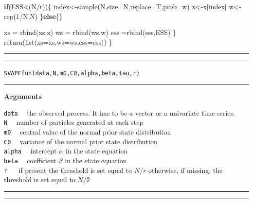 \documentclass[
]{book}
\newenvironment{Shaded}{\begin{snugshade}}{\end{snugshade}}
\newcommand{\AttributeTok}[1]{\textcolor[rgb]{0.77,0.63,0.00}{#1}}
\newcommand{\ControlFlowTok}[1]{\textcolor[rgb]{0.13,0.29,0.53}{\textbf{#1}}}
\newcommand{\DecValTok}[1]{\textcolor[rgb]{0.00,0.00,0.81}{#1}}
\newcommand{\FunctionTok}[1]{\textcolor[rgb]{0.00,0.00,0.00}{#1}}
\newcommand{\NormalTok}[1]{#1}
\newcommand{\OtherTok}[1]{\textcolor[rgb]{0.56,0.35,0.01}{#1}}
\newcommand{\SpecialCharTok}[1]{\textcolor[rgb]{0.00,0.00,0.00}{#1}}
\theoremstyle{break}
\theoremstyle{nonumberplain}
\begin{document}
\begin{Shaded}
\begin{Highlighting}[]
    \ControlFlowTok{if}\NormalTok{(ESS}\SpecialCharTok{\textless{}}\NormalTok{(N}\SpecialCharTok{/}\NormalTok{r))\{}
\NormalTok{      index}\OtherTok{\textless{}{-}}\FunctionTok{sample}\NormalTok{(N,}\AttributeTok{size=}\NormalTok{N,}\AttributeTok{replace=}\NormalTok{T,}\AttributeTok{prob=}\NormalTok{w)}
\NormalTok{      x}\OtherTok{\textless{}{-}}\NormalTok{x[index]}
\NormalTok{      w}\OtherTok{\textless{}{-}}\FunctionTok{rep}\NormalTok{(}\DecValTok{1}\SpecialCharTok{/}\NormalTok{N,N)}
\NormalTok{    \}}\ControlFlowTok{else}\NormalTok{\{\}}
    
\NormalTok{    xs }\OtherTok{=} \FunctionTok{rbind}\NormalTok{(xs,x)}
\NormalTok{    ws }\OtherTok{=} \FunctionTok{rbind}\NormalTok{(ws,w)}
\NormalTok{    ess }\OtherTok{=}\FunctionTok{rbind}\NormalTok{(ess,ESS)}
\NormalTok{  \}}
  \FunctionTok{return}\NormalTok{(}\FunctionTok{list}\NormalTok{(}\AttributeTok{xs=}\NormalTok{xs,}\AttributeTok{ws=}\NormalTok{ws,}\AttributeTok{ess=}\NormalTok{ess))}
\NormalTok{\}}
\end{Highlighting}
\end{Shaded}

\hfill\break

\hrule
\hrule

\hfill\break
\texttt{SVAPFfun(data,N,m0,C0,alpha,beta,tau,r)}\\

\hrule

\textbf{Arguments}

\texttt{data} ~~the observed process. It has to be a vector or a
univariate time series.\\
\texttt{N} ~~number of particles generated at each step\\
\texttt{m0} ~~central value of the normal prior state distribution\\
\texttt{C0} ~~variance of the normal prior state distribution\\
\texttt{alpha} ~~intercept \(\alpha\) in the state equation\\
\texttt{beta} ~~coefficient \(\beta\) in the state equation\\
\texttt{r} ~~ if present the threshold is set equal to \(N/r\)
otherwise, if missing, the threshold is set equal to \(N/2\)

\hrule
\hrule
\end{document}
